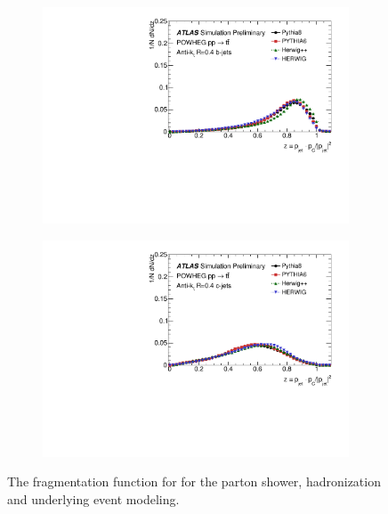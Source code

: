 \begin{figure}
\centering
\begin{subfigure}[]{0.45\textwidth}
\includegraphics[width=\textwidth]{evtgen/figures/Frag/Top/h_BFrag_SingleHad.pdf}
\end{subfigure}
\begin{subfigure}[]{0.45\textwidth}
\includegraphics[width=\textwidth]{evtgen/figures/Frag/Top/h_CFrag_SingleHad.pdf}
\end{subfigure}
\caption{The fragmentation function for 
for the parton shower, hadronization and underlying event modeling.}
\label{fig:tfrag}
\end{figure}

